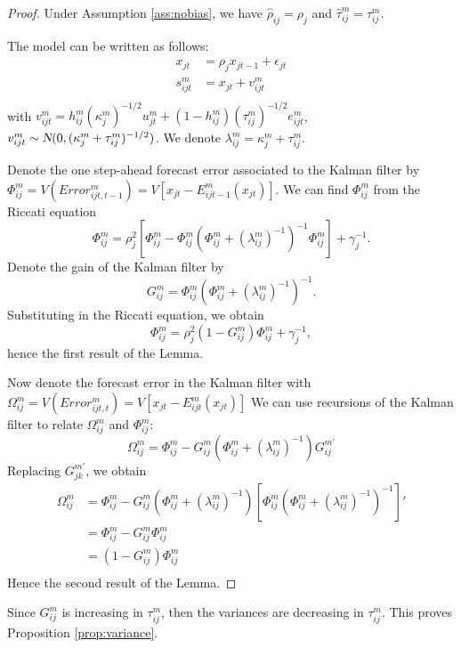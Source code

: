 \begin{proof}

Under Assumption \ref{ass:nobias}, we have $\hat\rho_{ij}=\rho_j$ and $\hat\tau_{ij}^m=\tau_{ij}^m$.

The model can be written as follows:
\begin{equation}\begin{array}{ll}x_{jt}	&=\rho_jx_{jt-1}+\epsilon_{jt}\\
								s_{ijt}^m&=x_{jt}+v_{ijt}^m\\
								\end{array}\label{eq:model}\end{equation}
with $v_{ijt}^m=h_{ij}^m(\kappa^m_{j})^{-1/2}u_{jt}^m+(1-h_{ij}^m)(\tau^m_{ij})^{-1/2}e^m_{ijt}$, $v_{ijt}^m\sim\textsl{N}(0,(\kappa_j^m+\tau_{ij}^m)^{-1/2})$. We denote $\lambda_{ij}^m=\kappa_j^m+\tau_{ij}^m$.

Denote the one step-ahead forecast error associated to the Kalman filter by $\Phi_{ij}^m=V(Error_{ijt,t-1}^m)=V[x_{jt}-E_{ijt-1}^m(x_{jt})]$. We can find $\Phi_{ij}^m$ from the Riccati equation $$\Phi_{ij}^m=\rho_j^2[\Phi_{ij}^m-\Phi_{ij}^m(\Phi_{ij}^m+(\lambda_{ij}^m)^{-1})^{-1}\Phi_{ij}^m]+\gamma_j^{-1}.$$ Denote the gain of the Kalman filter by $$G_{ij}^m=\Phi_{ij}^m(\Phi_{ij}^m+(\lambda_{ij}^m)^{-1})^{-1}.$$ Substituting in the Riccati equation, we obtain
$$\Phi_{ij}^m=\rho_j^2(1-G_{ij}^m)\Phi_{ij}^m+\gamma_j^{-1},$$
hence the first result of the Lemma.

Now denote the forecast error in the Kalman filter with $\Omega_{ij}^m=V(Error_{ijt,t}^m)=V[x_{jt}-E_{ijt}^m(x_{jt})]$
We can use recursions of the Kalman filter to relate $\Omega_{ij}^m$ and $\Phi_{ij}^m$:
$$\Omega_{ij}^m=\Phi_{ij}^m-G_{ij}^m(\Phi_{ij}^m+(\lambda_{ij}^m)^{-1})G_{ij}^{m'}$$
Replacing $G_{jk}^{m'}$, we obtain
$$\begin{array}{ll}\Omega_{ij}^m&=\Phi_{ij}^m-G_{ij}^m(\Phi_{ij}^m+(\lambda_{ij}^m)^{-1})[\Phi_{ij}^m(\Phi_{ij}^m+(\lambda_{ij}^m)^{-1})^{-1}]'\\
															&=\Phi_{ij}^m-G_{ij}^m\Phi_{ij}^m\\
															&=(1-G_{ij}^m)\Phi_{ij}^m\\
															\end{array}$$
Hence the second result of the Lemma.
\end{proof}

Since $G_{ij}^m$ is increasing in $\tau_{ij}^m$, then the variances are decreasing in $\tau_{ij}^m$. This proves Proposition \ref{prop:variance}.

